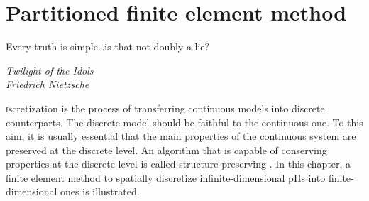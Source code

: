 \chapter{Partitioned finite element method}

\epigraph{Every truth is simple\dots is that not doubly a lie?}{\textit{Twilight of the Idols \\ Friedrich Nietzsche}}

\lettrine{\color{theme}{D}}iscretization is the process of transferring continuous models into discrete counterparts. The discrete model should be faithful to the continuous one. To this aim, it is usually essential that the main properties of the continuous system are preserved at the discrete level. An algorithm that is capable of conserving properties at the discrete level is called structure-preserving \cite{christiansen2011}. In this chapter, a finite element method to spatially discretize infinite-dimensional pHs into finite-dimensional ones is illustrated.

